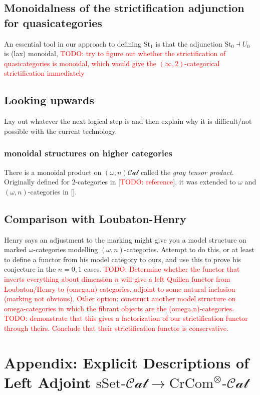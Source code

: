 \documentclass[12pt]{article}
\theoremstyle{definition}
\newcommand{\TODO}[1]{\textcolor{red}{TODO: {#1}}}
\newcommand{\crcom}{\text{CrCom}}
\newcommand{\omegancat}[1]{(\omega,#1)\mathcal{Cat}}
\newcommand{\tensorcrossedcat}{\crcom^\otimes\text{-}\mathcal{Cat}}
\newcommand{\ssetcat}{\text{sSet}\text{-}\mathcal{Cat}}
\begin{document}
\subsection{Monoidalness of the strictification adjunction for quasicategories}
	An essential tool in our approach to defining $\text{St}_1$ is that the adjunction $\text{St}_0 \dashv U_0$ is (lax) monoidal, 
	\TODO{try to figure out whether the strictification of quasicategories is monoidal, which would give the $(\infty,2)$-categorical strictification immediately}
\subsection{Looking upwards}
	Lay out whatever the next logical step is and then explain why it is difficult/not possible with the current technology.	
\subsubsection{monoidal structures on higher categories}
	There is a monoidal product on $\omegancat{n}$ called the \textit{gray tensor product}.
	Originally defined for $2$-categories in [\TODO{reference}], it was extended to $\omega$ and $(\omega,n)$-categories in []. 

\subsection{Comparison with Loubaton-Henry}
		Henry says an adjustment to the marking might give you a model structure on marked $\omega$-categories modelling $(\omega,n)$-categories. Attempt to do this, or at least to define a functor from his model category to ours, and use this to prove his conjecture in the $n = 0,1$ cases.
		\TODO{Determine whether the functor that inverts everything about dimension $n$ will give a left Quillen functor from Loubaton/Henry to (omega,n)-categories, adjoint to some natural inclusion (marking not obvious). Other option: construct another model structure on omega-categories in which the fibrant objects are the (omega,n)-categories.}
		\TODO{demonstrate that this gives a factorization of our strictification functor through theirs. Conclude that their strictification functor is conservative.}
		
\section{Appendix: Explicit Descriptions of Left Adjoint $\ssetcat \to \tensorcrossedcat$ }
\end{document}
